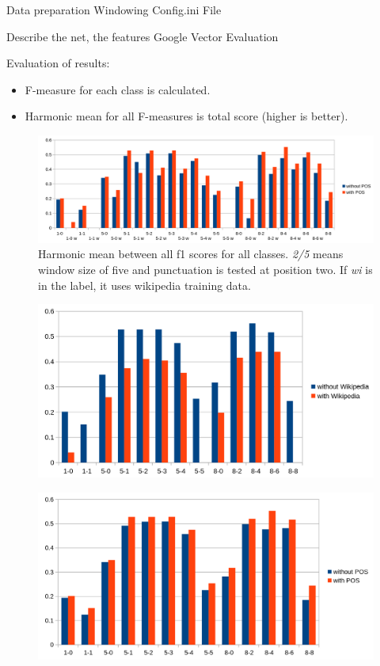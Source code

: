 Data preparation
Windowing
Config.ini File

Describe the net, the features
Google Vector
Evaluation


Evaluation of results:
\begin{itemize}
\item F-measure for each class is calculated.
\item Harmonic mean for all F-measures is total score (higher is better).
\end{itemize}

\begin{figure}[ht]
    \centering
    \includegraphics[width=\textwidth]{img/window_eval.png}
    \caption{Harmonic mean between all f1 scores for all classes. \emph{2/5} means window size of five and punctuation is tested at position two. If \emph{wi} is in the label, it uses wikipedia training data.}
    \label{window_eval}
\end{figure}

\begin{figure}[ht]
    \centering
    \includegraphics[width=\textwidth]{img/window_wiki_eval.png}
    \caption{}
    \label{window_wiki_eval}
\end{figure}

\begin{figure}[ht]
    \centering
    \includegraphics[width=\textwidth]{img/window_pos_eval.png}
    \caption{}
    \label{window_pos_eval}
\end{figure}

